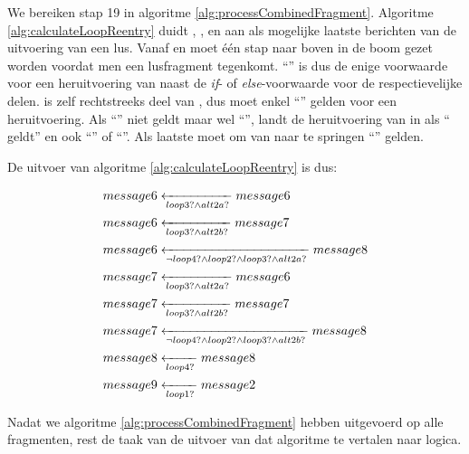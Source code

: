 We bereiken stap 19 in algoritme \ref{alg:processCombinedFragment}. Algoritme \ref{alg:calculateLoopReentry} duidt , ,  en  aan als mogelijke laatste berichten van de uitvoering van een lus. Vanaf  en  moet \'e\'en stap naar boven in de boom gezet worden voordat men een lusfragment tegenkomt. ``'' is dus de enige voorwaarde voor een heruitvoering van  naast de \textit{if}- of \textit{else}-voorwaarde voor de respectievelijke delen.  is zelf rechtstreeks deel van , dus moet enkel ``'' gelden voor een heruitvoering. Als ``'' niet geldt maar wel ``'', landt de heruitvoering van  in  als `` geldt'' en ook ``'' of ``''. Als laatste moet om van  naar  te springen ``'' gelden. 

De uitvoer van algoritme \ref{alg:calculateLoopReentry} is dus:

\begin{align*}
	&\transitionentry[message6]{\fragcond{loop3} \land \fragcond{alt2a}}{message6} \\
	&\transitionentry[message7]{\fragcond{loop3} \land \fragcond{alt2b}}{message6} \\
	&\transitionentry[message8]{\lnot \fragcond{loop4} \land \fragcond{loop2} \land \fragcond{loop3} \land \fragcond{alt2a}}{message6} \\
	&\transitionentry[message6]{\fragcond{loop3} \land \fragcond{alt2a}}{message7} \\
	&\transitionentry[message7]{\fragcond{loop3} \land \fragcond{alt2b}}{message7} \\
	&\transitionentry[message8]{\lnot \fragcond{loop4} \land \fragcond{loop2} \land \fragcond{loop3} \land \fragcond{alt2b}}{message7} \\
	&\transitionentry[message8]{\fragcond{loop4}}{message8} \\
	&\transitionentry[message2]{\fragcond{loop1}}{message9}
\end{align*}

\parbreak

Nadat we algoritme \ref{alg:processCombinedFragment} hebben uitgevoerd op alle fragmenten, rest de taak van de uitvoer van dat algoritme te vertalen naar logica.

